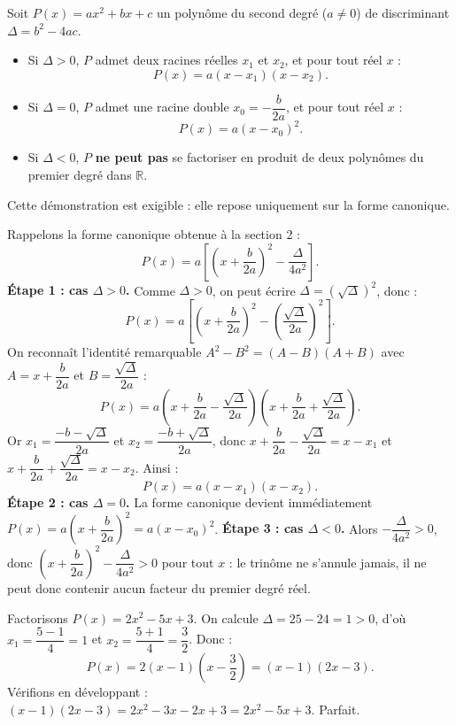 \documentclass[11pt]{article}
\begin{document}
\begin{propriete}
Soit $P(x)=ax^2+bx+c$ un polynôme du second degré ($a\neq 0$) de discriminant $\Delta=b^2-4ac$.
\begin{itemize}
\item Si $\Delta>0$, $P$ admet deux racines réelles $x_1$ et $x_2$, et pour tout réel $x$ :
\[ P(x)=a(x-x_1)(x-x_2). \]
\item Si $\Delta=0$, $P$ admet une racine double $x_0=-\dfrac{b}{2a}$, et pour tout réel $x$ :
\[ P(x)=a(x-x_0)^2. \]
\item Si $\Delta<0$, $P$ \textbf{ne peut pas} se factoriser en produit de deux polynômes du premier degré dans $\mathbb{R}$.
\end{itemize}
Cette démonstration est exigible : elle repose uniquement sur la forme canonique.
\end{propriete}

\begin{experience}
Rappelons la forme canonique obtenue à la section 2 :
\[ P(x)=a\left[\left(x+\frac{b}{2a}\right)^2-\frac{\Delta}{4a^2}\right]. \]
\textbf{Étape 1 : cas $\Delta>0$.} Comme $\Delta>0$, on peut écrire $\Delta=(\sqrt{\Delta})^2$, donc :
\[ P(x)=a\left[\left(x+\frac{b}{2a}\right)^2-\left(\frac{\sqrt{\Delta}}{2a}\right)^2\right]. \]
On reconnaît l'identité remarquable $A^2-B^2=(A-B)(A+B)$ avec $A=x+\dfrac{b}{2a}$ et $B=\dfrac{\sqrt{\Delta}}{2a}$ :
\[ P(x)=a\left(x+\frac{b}{2a}-\frac{\sqrt{\Delta}}{2a}\right)\left(x+\frac{b}{2a}+\frac{\sqrt{\Delta}}{2a}\right). \]
Or $x_1=\dfrac{-b-\sqrt{\Delta}}{2a}$ et $x_2=\dfrac{-b+\sqrt{\Delta}}{2a}$, donc $x+\dfrac{b}{2a}-\dfrac{\sqrt{\Delta}}{2a}=x-x_1$ et $x+\dfrac{b}{2a}+\dfrac{\sqrt{\Delta}}{2a}=x-x_2$. Ainsi :
\[ P(x)=a(x-x_1)(x-x_2). \]
\textbf{Étape 2 : cas $\Delta=0$.} La forme canonique devient immédiatement $P(x)=a\left(x+\dfrac{b}{2a}\right)^2=a(x-x_0)^2$.
\textbf{Étape 3 : cas $\Delta<0$.} Alors $-\dfrac{\Delta}{4a^2}>0$, donc $\left(x+\dfrac{b}{2a}\right)^2-\dfrac{\Delta}{4a^2}>0$ pour tout $x$ : le trinôme ne s'annule jamais, il ne peut donc contenir aucun facteur du premier degré réel.
\end{experience}

\begin{exemplebox}
Factorisons $P(x)=2x^2-5x+3$. On calcule $\Delta=25-24=1>0$, d'où $x_1=\dfrac{5-1}{4}=1$ et $x_2=\dfrac{5+1}{4}=\dfrac{3}{2}$. Donc :
\[ P(x)=2(x-1)\left(x-\frac{3}{2}\right)=(x-1)(2x-3). \]
Vérifions en développant : $(x-1)(2x-3)=2x^2-3x-2x+3=2x^2-5x+3$. Parfait.
\end{exemplebox}
\end{document}
